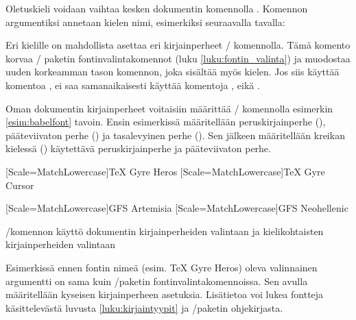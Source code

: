 \begin{koodilohkosis}
\end{koodilohkosis}

Oletuskieli voidaan vaihtaa kesken dokumentin komennolla
. Komennon argumentiksi annetaan kielen nimi,
esimerkiksi seuraavalla tavalla:

\begin{koodilohkosis}
\end{koodilohkosis}

Eri kielille on mahdollista asettaa eri kirjainperheet
\-/ komennolla. Tämä komento korvaa
\-/ paketin fontinvalintakomennot (luku
\ref{luku:fontin_valinta}) ja muodostaa uuden korkeamman tason komennon,
joka sisältää myös kielen. Jos siis käyttää komentoa
, ei saa samanaikaisesti käyttää komentoja
,  eikä .

Oman dokumentin kirjainperheet voitaisiin määrittää
\-/ komennolla esimerkin \ref{esim:babelfont} tavoin.
Ensin esimerkissä määritellään peruskirjainperhe (),
pääteviivaton perhe () ja tasalevyinen perhe (). Sen
jälkeen määritellään kreikan kielessä () käytettävä
peruskirjainperhe ja pääteviivaton perhe.

\begin{esimerkki*}

\begin{koodilohko}
  [Scale=MatchLowercase]{TeX Gyre Heros}
  [Scale=MatchLowercase]{TeX Gyre Cursor}

  [Scale=MatchLowercase]{GFS Artemisia}
  [Scale=MatchLowercase]{GFS Neohellenic}
\end{koodilohko}
\caption{\-/komennon käyttö dokumentin
  kirjainperheiden valintaan ja kielikohtaisten kirjainperheiden
  valintaan}
\label{esim:babelfont}
\end{esimerkki*}

Esimerkissä ennen fontin nimeä (esim. TeX Gyre Heros) oleva valinnainen
argumentti on sama kuin \-/paketin
fontinvalintakomennoissa. Sen avulla määritellään kyseisen
kirjainperheen asetuksia. Lisätietoa voi lukea fontteja käsittelevästä
luvusta \ref{luku:kirjaintyypit} ja \-/paketin
ohjekirjasta.

